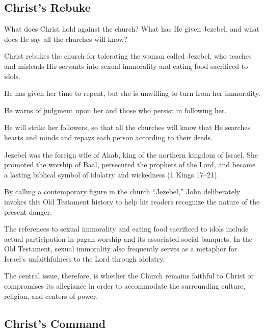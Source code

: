 \subsection{Christ's Rebuke}

\begin{ScriptureBox2}{What does Christ hold against the church? What has He given Jezebel, and what does He say all the churches will know?}
\item[2:20] Christ rebukes the church for tolerating the woman called Jezebel, who teaches and misleads His servants into sexual immorality and eating food sacrificed to idols.

\item[2:21] He has given her time to repent, but she is unwilling to turn from her immorality.

\item[2:22] He warns of judgment upon her and those who persist in following her.

\item[2:23] He will strike her followers, so that all the churches will know that He searches hearts and minds and repays each person according to their deeds.
\end{ScriptureBox2}

Jezebel was the foreign wife of Ahab, king of the northern kingdom of Israel. She promoted the worship of Baal, persecuted the prophets of the Lord, and became a lasting biblical symbol of idolatry and wickedness (1 Kings 17--21).

By calling a contemporary figure in the church ``Jezebel,'' John deliberately invokes this Old Testament history to help his readers recognize the nature of the present danger.

The references to sexual immorality and eating food sacrificed to idols include actual participation in pagan worship and its associated social banquets. In the Old Testament, sexual immorality also frequently serves as a metaphor for Israel's unfaithfulness to the Lord through idolatry.

The central issue, therefore, is whether the Church remains faithful to Christ or compromises its allegiance in order to accommodate the surrounding culture, religion, and centers of power.

\subsection{Christ's Command}

